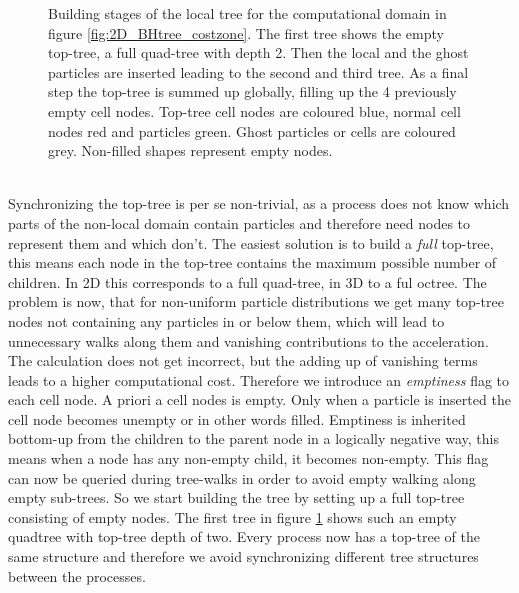 \begin{figure}[htbp]
\begin{center}
\caption{Building stages of the local tree for the computational domain in figure \ref{fig:2D_BHtree_costzone}. The first tree shows the empty top-tree, a full quad-tree with depth 2. Then the local and the ghost particles are inserted leading to the second and third tree. As a final step the top-tree is summed up globally, filling up the 4 previously empty cell nodes. Top-tree cell nodes are coloured blue, normal cell nodes red and particles green. Ghost particles or cells are coloured grey. Non-filled shapes represent empty nodes.}
\label{fig:2D_BHtree_building}
\end{center}
\end{figure}\\

Synchronizing the top-tree is per se non-trivial, as a process does not know which parts of the non-local domain contain particles and therefore need nodes to represent them and which don't. The easiest solution is to build a \emph{full} top-tree, this means each node in the top-tree contains the maximum possible number of children. In 2D this corresponds to a full quad-tree, in 3D to a ful octree. The problem is now, that for non-uniform particle distributions we get many top-tree nodes not containing any particles in or below them, which will lead to unnecessary walks along them and vanishing contributions to the acceleration. The calculation does not get incorrect, but the adding up of vanishing terms leads to a higher computational cost. Therefore we introduce an \emph{emptiness} flag to each cell node. A priori a cell nodes is empty. Only when a particle is inserted the cell node becomes unempty or in other words filled. Emptiness is inherited bottom-up from the children to the parent node in a logically negative way, this means when a node has any non-empty child, it becomes non-empty. This flag can now be queried during tree-walks in order to avoid empty walking along empty sub-trees. So we start building the tree by setting up a full top-tree consisting of empty nodes. The first tree in figure \ref{fig:2D_BHtree_building} shows such an empty quadtree with top-tree depth of two. Every process now has a top-tree of the same structure and therefore we avoid synchronizing different tree structures between the processes.\\

